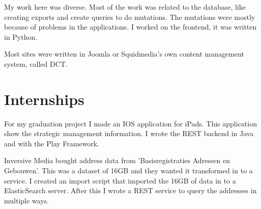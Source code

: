 \documentclass[]{deedy-resume-openfont}
\begin{document}
\begin{minipage}[t]{0.66\textwidth}
My work here was diverse. 
Most of the work was related to the database, like creating exports and create queries to do mutations.
The mutations were mostly because of problems in the applications.
I worked on the frontend, it was written in Python.
\sectionsep

Most sites were written in Joomla or Squidmedia's own content management system, called DCT.
\sectionsep

\end{minipage} 
\pagebreak

\begin{minipage}[t]{0.66\textwidth} 

\section{Internships}
For my graduation project I made an IOS application for iPads. 
This application show the strategic management information. 
I wrote the REST backend in Java and with the Play Framework.
\sectionsep

Inversive Media bought address data from 'Basisregistraties Adressen en Gebouwen'.
This was a dataset of 16GB and they wanted it transformed in to a service.
I created an import script that imported the 16GB of data in to a ElasticSearch server.
After this I wrote a REST service to query the addresses in multiple ways.
\sectionsep

\end{minipage}
\hfill
\end{document}
